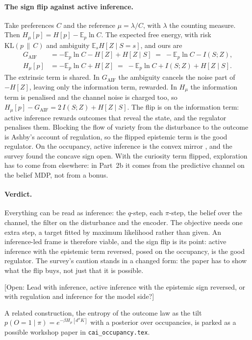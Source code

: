 \documentclass[10pt]{article}
\newcommand{\Hmu}{H_\mu}
\newcommand{\dpi}{d^\pi}
\newcommand{\E}{\mathbb E}
\newcommand{\open}[1]{\textcolor{red!70!black}{[Open: #1]}}
\begin{document}
\paragraph{The sign flip against active inference.} Take preferences $C$ and the reference $\mu = \lambda / C$, with $\lambda$ the counting measure. Then $\Hmu[p] = H[p] - \E_p \ln C$. The expected free energy, with risk $\mathrm{KL}(p\,\|\,C)$ and ambiguity $\E_s H[Z \mid S=s]$, and ours are
\begin{align}
  G_{\mathrm{AIF}} &= -\E_p \ln C - H[Z] + H[Z \mid S] \;=\; -\E_p \ln C - I(S;Z), \\
  \Hmu[p] &= -\E_p \ln C + H[Z] \;=\; -\E_p \ln C + I(S;Z) + H[Z \mid S].
\end{align}
The extrinsic term is shared. In $G_{\mathrm{AIF}}$ the ambiguity cancels the noise part of $-H[Z]$, leaving only the information term, rewarded. In $\Hmu$ the information term is penalised and the channel noise is charged too, so $\Hmu[p] - G_{\mathrm{AIF}} = 2\, I(S;Z) + H[Z \mid S]$. The flip is on the information term: active inference rewards outcomes that reveal the state, and the regulator penalises them. Blocking the flow of variety from the disturbance to the outcome is Ashby's account of regulation, so the flipped epistemic term is the good regulator. On the occupancy, active inference is the convex mirror \citep{Milosevic-active26}, and the survey found the concave sign open. With the curiosity term flipped, exploration has to come from elsewhere: in Part~2b it comes from the predictive channel on the belief MDP, not from a bonus.

\paragraph{Verdict.} Everything can be read as inference: the $q$-step, each $\pi$-step, the belief over the channel, the filter on the disturbance and the encoder. The objective needs one extra step, a target fitted by maximum likelihood rather than given. An inference-led frame is therefore viable, and the sign flip is its point: active inference with the epistemic term reversed, posed on the occupancy, is the good regulator. The survey's caution stands in a changed form: the paper has to show what the flip buys, not just that it is possible.

\open{Lead with inference, active inference with the epistemic sign reversed, or with regulation and inference for the model side?}

\noindent
A related construction, the entropy of the outcome law as the tilt $p(O=1\mid\pi)=e^{-\beta\Hmu[\dpi K]}$ with a posterior over occupancies, is parked as a possible workshop paper in \texttt{cai\_occupancy.tex}.


  {\newcommand{\surveybib}{notes_joery/joery_survey}}
  {\newcommand{\surveybib}{joery_survey}}

\end{document}

